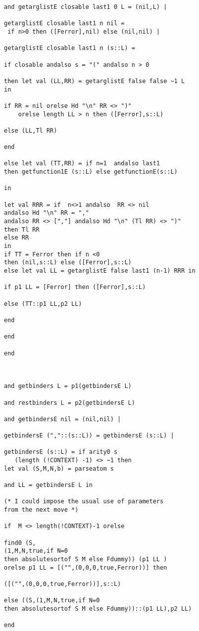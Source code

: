 \documentclass[12pt]{article}
\begin{document}
\begin{verbatim}
and getarglistE closable last1 0 L = (nil,L) |

getarglistE closable last1 n nil =
 if n>0 then ([Ferror],nil) else (nil,nil) |

getarglistE closable last1 n (s::L) =

if closable andalso s = "(" andalso n > 0

then let val (LL,RR) = getarglistE false false ~1 L
in

if RR = nil orelse Hd "\n" RR <> ")" 
    orelse length LL > n then ([Ferror],s::L)

else (LL,Tl RR)

end

else let val (TT,RR) = if n=1  andalso last1
then getfunction1E (s::L) else getfunctionE(s::L)

in

let val RRR = if  n<>1 andalso  RR <> nil 
andalso Hd "\n" RR = "," 
andalso RR <> [","] andalso Hd "\n" (Tl RR) <> ")"
then Tl RR
else RR
in
if TT = Ferror then if n <0 
then (nil,s::L) else ([Ferror],s::L)
else let val LL = getarglistE false last1 (n-1) RRR in

if p1 LL = [Ferror] then ([Ferror],s::L)

else (TT::p1 LL,p2 LL)

end

end

end



and getbinders L = p1(getbindersE L)

and restbinders L = p2(getbindersE L)

and getbindersE nil = (nil,nil) |

getbindersE (","::(s::L)) = getbindersE (s::L) |

getbindersE (s::L) = if arity0 s 
   (length (!CONTEXT) -1) <> ~1 then 
let val (S,M,N,b) = parseatom s

and LL = getbindersE L in

(* I could impose the usual use of parameters
from the next move *)

if  M <> length(!CONTEXT)-1 orelse 

find0 (S,
(1,M,N,true,if N=0 
then absolutesortof S M else Fdummy)) (p1 LL )
orelse p1 LL = [("",(0,0,0,true,Ferror))] then 

([("",(0,0,0,true,Ferror))],s::L)

else ((S,(1,M,N,true,if N=0 
then absolutesortof S M else Fdummy))::(p1 LL),p2 LL)

end


\end{verbatim}
\end{document}
